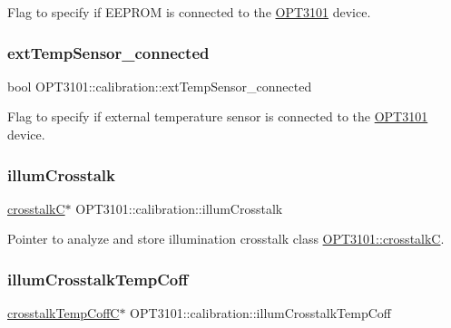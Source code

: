 Flag to specify if E\+E\+P\+R\+OM is connected to the \mbox{\hyperlink{namespace_o_p_t3101}{O\+P\+T3101}} device. 

\mbox{\label{class_o_p_t3101_1_1calibration_a937b08e4daf706842ae8e64eed4065bc}} 
\subsubsection{\texorpdfstring{ext\+Temp\+Sensor\+\_\+connected}{extTempSensor\_connected}}
{\footnotesize\ttfamily bool O\+P\+T3101\+::calibration\+::ext\+Temp\+Sensor\+\_\+connected}



Flag to specify if external temperature sensor is connected to the \mbox{\hyperlink{namespace_o_p_t3101}{O\+P\+T3101}} device. 

\mbox{\label{class_o_p_t3101_1_1calibration_a0aebed125263addca8bd8c809aad26f0}} 
\subsubsection{\texorpdfstring{illum\+Crosstalk}{illumCrosstalk}}
{\footnotesize\ttfamily \mbox{\hyperlink{class_o_p_t3101_1_1crosstalk_c}{crosstalkC}}$\ast$ O\+P\+T3101\+::calibration\+::illum\+Crosstalk}



Pointer to analyze and store illumination crosstalk class \mbox{\hyperlink{class_o_p_t3101_1_1crosstalk_c}{O\+P\+T3101\+::crosstalkC}}. 

\mbox{\label{class_o_p_t3101_1_1calibration_a5c5c221a8ff9285838315b9242d4d777}} 
\subsubsection{\texorpdfstring{illum\+Crosstalk\+Temp\+Coff}{illumCrosstalkTempCoff}}
{\footnotesize\ttfamily \mbox{\hyperlink{class_o_p_t3101_1_1crosstalk_temp_coff_c}{crosstalk\+Temp\+CoffC}}$\ast$ O\+P\+T3101\+::calibration\+::illum\+Crosstalk\+Temp\+Coff}



